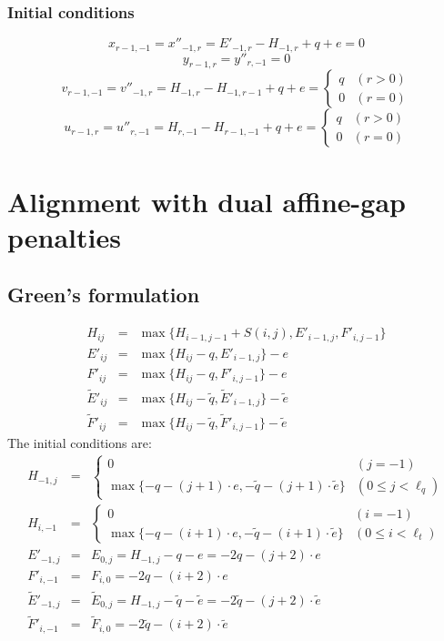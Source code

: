 \documentclass[10pt]{article}
\begin{document}
\subsubsection{Initial conditions}
\[x_{r-1,-1}=x''_{-1,r}=E'_{-1,r}-H_{-1,r}+q+e=0\]
\[y_{r-1,r}=y''_{r,-1}=0\]
\[v_{r-1,-1}=v''_{-1,r}=H_{-1,r}-H_{-1,r-1}+q+e=\left\{\begin{array}{ll}
  q & (r>0) \\
  0 & (r=0)
\end{array}\right.\]
\[u_{r-1,r}=u''_{r,-1}=H_{r,-1}-H_{r-1,-1}+q+e=\left\{\begin{array}{ll}
  q & (r>0) \\
  0 & (r=0)
\end{array}\right.\]

\section{Alignment with dual affine-gap penalties}

\subsection{Green's formulation}

\begin{eqnarray*}
H_{ij} &=& \max\{H_{i-1,j-1}+S(i,j),E'_{i-1,j},F'_{i,j-1}\}\\
E'_{ij}&=& \max\{H_{ij}-q,E'_{i-1,j}\}-e\\
F'_{ij}&=& \max\{H_{ij}-q,F'_{i,j-1}\}-e\\
\tilde{E}'_{ij}&=& \max\{H_{ij}-\tilde{q},\tilde{E}'_{i-1,j}\}-\tilde{e}\\
\tilde{F}'_{ij}&=& \max\{H_{ij}-\tilde{q},\tilde{F}'_{i,j-1}\}-\tilde{e}
\end{eqnarray*}
The initial conditions are:
\begin{eqnarray*}
H_{-1,j}&=&
  \left\{\begin{array}{ll}
    0 & (j=-1)\\
	\max\{-q-(j+1)\cdot e,-\tilde{q}-(j+1)\cdot\tilde{e}\} & (0\le j<\ell_q)
  \end{array}\right.\\
H_{i,-1}&=&
  \left\{\begin{array}{ll}
    0 & (i=-1)\\
	\max\{-q-(i+1)\cdot e,-\tilde{q}-(i+1)\cdot\tilde{e}\} & (0\le i<\ell_t)
  \end{array}\right.\\
E'_{-1,j}&=&E_{0,j}=H_{-1,j}-q-e=-2q-(j+2)\cdot e\\
F'_{i,-1}&=&F_{i,0}=-2q-(i+2)\cdot e\\
\tilde{E}'_{-1,j}&=&\tilde{E}_{0,j}=H_{-1,j}-\tilde{q}-\tilde{e}=-2\tilde{q}-(j+2)\cdot\tilde{e}\\
\tilde{F}'_{i,-1}&=&\tilde{F}_{i,0}=-2\tilde{q}-(i+2)\cdot\tilde{e}
\end{eqnarray*}
\end{document}
